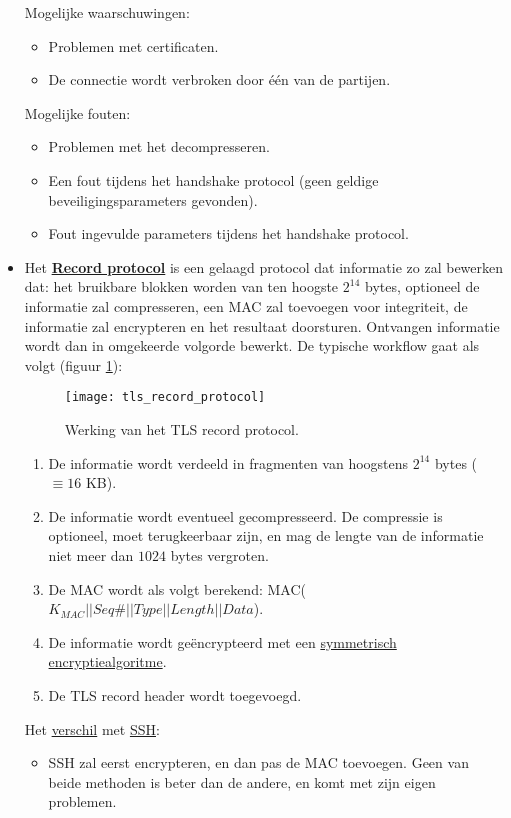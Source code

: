 \documentclass{report}
\begin{document}
\begin{itemize}
	Mogelijke waarschuwingen:
	\begin{itemize}
		\item Problemen met certificaten.
		\item De connectie wordt verbroken door één van de partijen.
	\end{itemize}
	Mogelijke fouten:
	\begin{itemize}
		\item Problemen met het decompresseren.
		\item Een fout tijdens het handshake protocol (geen geldige beveiligingsparameters gevonden).
		\item Fout ingevulde parameters tijdens het handshake protocol.
	\end{itemize}
	\item Het \underline{\textbf{Record protocol}} is een gelaagd protocol dat informatie zo zal bewerken dat: het bruikbare blokken worden van ten hoogste $2^{14}$ bytes, optioneel de informatie zal compresseren, een MAC zal toevoegen voor integriteit, de informatie zal encrypteren en het resultaat doorsturen. Ontvangen informatie wordt dan in omgekeerde volgorde bewerkt. De typische workflow gaat als volgt (figuur \ref{fig:tls_record_protocol}):
		\begin{figure}[ht]
			\texttt{[image: tls\_record\_protocol]}
			\caption{Werking van het TLS record protocol.}
			\label{fig:tls_record_protocol}
		\end{figure}
		\begin{enumerate}
			\item De informatie wordt verdeeld in fragmenten van hoogstens $2^{14}$ bytes ($\equiv 16$ KB).
			\item De informatie wordt eventueel gecompresseerd. De compressie is optioneel, moet terugkeerbaar zijn, en mag de lengte van de informatie niet meer dan $1024$ bytes vergroten.
			\item De MAC wordt als volgt berekend: MAC($K_{MAC} || Seq \# || Type || Length || Data$).
			\item De informatie wordt geëncrypteerd met een \underline{symmetrisch encryptiealgoritme}.
			\item De TLS record header wordt toegevoegd. 
		\end{enumerate}
	Het \underline{verschil} met \underline{SSH}:
		\begin{itemize}
			\item SSH zal eerst encrypteren, en dan pas de MAC toevoegen. Geen van beide methoden is beter dan de andere, en komt met zijn eigen problemen.

\end{itemize}
\end{itemize}
\end{document}
